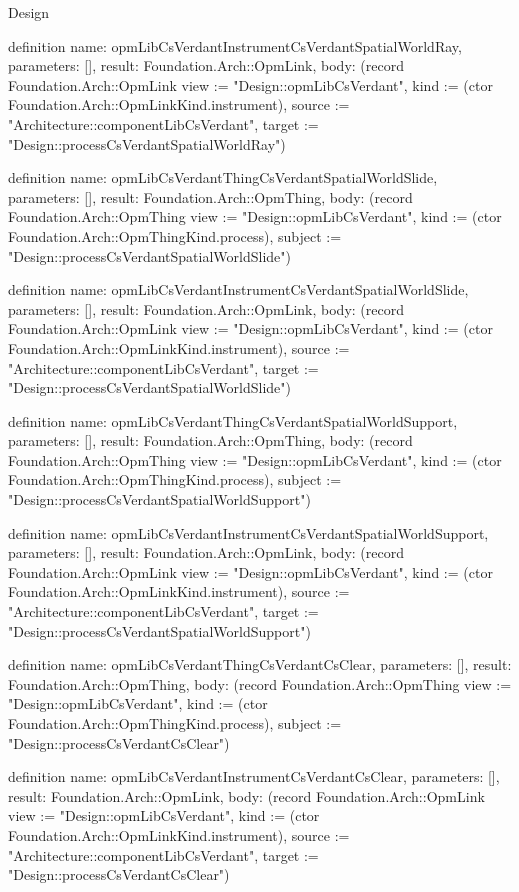 \begin{lexlean}{Design}
\begin{semanticmodule}
definition{
  name: opmLibCsVerdantInstrumentCsVerdantSpatialWorldRay,
  parameters: [],
  result: Foundation.Arch::OpmLink,
  body: (record Foundation.Arch::OpmLink {view := "Design::opmLibCsVerdant", kind := (ctor Foundation.Arch::OpmLinkKind.instrument), source := "Architecture::componentLibCsVerdant", target := "Design::processCsVerdantSpatialWorldRay"})
}

definition{
  name: opmLibCsVerdantThingCsVerdantSpatialWorldSlide,
  parameters: [],
  result: Foundation.Arch::OpmThing,
  body: (record Foundation.Arch::OpmThing {view := "Design::opmLibCsVerdant", kind := (ctor Foundation.Arch::OpmThingKind.process), subject := "Design::processCsVerdantSpatialWorldSlide"})
}

definition{
  name: opmLibCsVerdantInstrumentCsVerdantSpatialWorldSlide,
  parameters: [],
  result: Foundation.Arch::OpmLink,
  body: (record Foundation.Arch::OpmLink {view := "Design::opmLibCsVerdant", kind := (ctor Foundation.Arch::OpmLinkKind.instrument), source := "Architecture::componentLibCsVerdant", target := "Design::processCsVerdantSpatialWorldSlide"})
}

definition{
  name: opmLibCsVerdantThingCsVerdantSpatialWorldSupport,
  parameters: [],
  result: Foundation.Arch::OpmThing,
  body: (record Foundation.Arch::OpmThing {view := "Design::opmLibCsVerdant", kind := (ctor Foundation.Arch::OpmThingKind.process), subject := "Design::processCsVerdantSpatialWorldSupport"})
}

definition{
  name: opmLibCsVerdantInstrumentCsVerdantSpatialWorldSupport,
  parameters: [],
  result: Foundation.Arch::OpmLink,
  body: (record Foundation.Arch::OpmLink {view := "Design::opmLibCsVerdant", kind := (ctor Foundation.Arch::OpmLinkKind.instrument), source := "Architecture::componentLibCsVerdant", target := "Design::processCsVerdantSpatialWorldSupport"})
}

definition{
  name: opmLibCsVerdantThingCsVerdantCsClear,
  parameters: [],
  result: Foundation.Arch::OpmThing,
  body: (record Foundation.Arch::OpmThing {view := "Design::opmLibCsVerdant", kind := (ctor Foundation.Arch::OpmThingKind.process), subject := "Design::processCsVerdantCsClear"})
}

definition{
  name: opmLibCsVerdantInstrumentCsVerdantCsClear,
  parameters: [],
  result: Foundation.Arch::OpmLink,
  body: (record Foundation.Arch::OpmLink {view := "Design::opmLibCsVerdant", kind := (ctor Foundation.Arch::OpmLinkKind.instrument), source := "Architecture::componentLibCsVerdant", target := "Design::processCsVerdantCsClear"})
}


\end{semanticmodule}
\end{lexlean}
